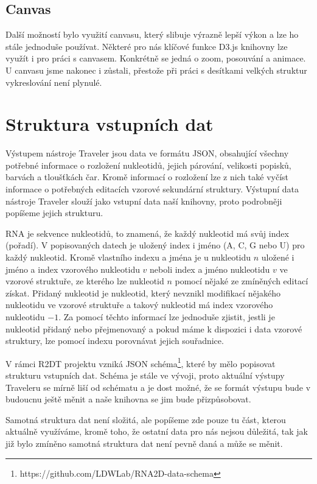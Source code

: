 \subsection{Canvas}

Další možností bylo využití canvasu, který slibuje výrazně lepší výkon a lze ho
stále jednoduše používat. Některé pro nás klíčové funkce D3.js knihovny lze
využít i pro práci s canvasem. Konkrétně se jedná o zoom, posouvání a animace.
U canvasu jsme nakonec i zůstali, přestože při práci s desítkami velkých
struktur vykreslování není plynulé.

\section{Struktura vstupních dat}

Výstupem nástroje Traveler jsou data ve formátu JSON, obsahující všechny
potřebné informace o rozložení nukleotidů, jejich párování, velikosti popisků,
barvách a tloušťkách čar. Kromě informací o rozložení lze z nich také vyčíst
informace o potřebných editacích vzorové sekundární struktury. Výstupní data
nástroje Traveler slouží jako vstupní data naší knihovny, proto podrobněji
popíšeme jejich strukturu.

RNA je sekvence nukleotidů, to znamená, že každý nukleotid má svůj index
(pořadí). V popisovaných datech je uložený index i jméno (A, C, G nebo U) pro
každý nukleotid. Kromě vlastního indexu a jména je u nukleotidu $n$ uložené i
jméno a index vzorového nukleotidu $v$ neboli index a jméno nukleotidu $v$ ve
vzorové struktuře, ze kterého lze nukleotid $n$ pomocí nějaké ze zmíněných
editací získat. Přidaný nukleotid je nukleotid, který nevznikl modifikací
nějakého nukleotidu ve vzorové struktuře a takový nukleotid má index vzorového
nukleotidu $-1$. Za pomocí těchto informací lze jednoduše zjistit, jestli je
nukleotid přidaný nebo přejmenovaný a pokud máme k dispozici i data vzorové
struktury, lze pomocí indexu porovnávat jejich souřadnice.

V rámci R2DT projektu vzniká JSON
schéma\footnote{https://github.com/LDWLab/RNA2D-data-schema}, které by mělo
popisovat strukturu vstupních dat. Schéma je stále ve vývoji, proto aktuální
výstupy Traveleru se mírně liší od schématu a je dost možné, že se formát
výstupu bude v budoucnu ještě měnit a naše knihovna se jim bude přizpůsobovat.

Samotná struktura dat není složitá, ale popíšeme zde pouze tu část, kterou
aktuálně využíváme, kromě toho, že ostatní data pro nás nejsou důležitá, tak
jak již bylo zmíněno samotná struktura dat není pevně daná a může se měnit.


